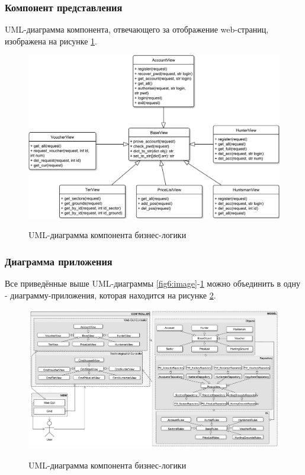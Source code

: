		\subsubsection{Компонент представления}
		UML-диаграмма компонента, отвечающего за отображение web-страниц, изображена на рисунке \ref{fig8:image}.
		
		\begin{figure}[pt!]
			\centering
			\begin{center}
				{\includegraphics[scale=0.6]{schemes/webGUI.pdf}}
				\caption{UML-диаграмма компонента бизнес-логики}
				\label{fig8:image}
			\end{center}
		\end{figure}
		\newpage
	
		\subsubsection{Диаграмма приложения}
		Все приведённые выше UML-диаграммы \ref{fig6:image}-\ref{fig8:image} можно объединить в одну - диаграмму-приложения, которая находится на рисунке \ref{fig9:image}.
		
		\begin{figure}[ph!]
			\centering
			\begin{center}
				{\includegraphics[scale=0.44, angle=90]{schemes/uml_full.pdf}}
				\caption{UML-диаграмма компонента бизнес-логики}
				\label{fig9:image}
			\end{center}
		\end{figure}
	\newpage
	
